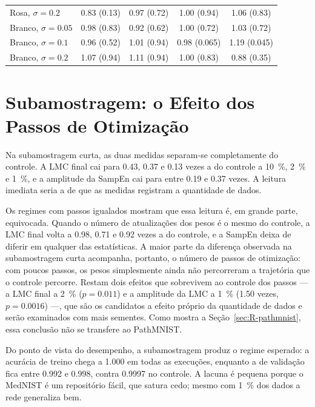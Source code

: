 \begin{table}[H]
\begin{tabular}{lcccc}
        Rosa, $\sigma = \num{0,2}$    & \num{0,83} (\num{0,13}) & \num{0,97} (\num{0,72}) & \num{1,00} (\num{0,94}) & \num{1,06} (\num{0,83}) \\
        Branco, $\sigma = \num{0,05}$ & \num{0,98} (\num{0,83}) & \num{0,92} (\num{0,62}) & \num{1,00} (\num{0,72}) & \num{1,03} (\num{0,72}) \\
        Branco, $\sigma = \num{0,1}$  & \num{0,96} (\num{0,52}) & \num{1,01} (\num{0,94}) & \num{0,98} (\num{0,065}) & \num{1,19} (\num{0,045}) \\
        Branco, $\sigma = \num{0,2}$  & \num{1,07} (\num{0,94}) & \num{1,11} (\num{0,94}) & \num{1,00} (\num{0,83}) & \num{0,88} (\num{0,35}) \\
        \bottomrule
    \end{tabular}
\end{table}

\section{Subamostragem: o Efeito dos Passos de Otimização}
\label{sec:R-subamostragem}

Na subamostragem curta, as duas medidas separam-se completamente do controle.
A LMC final cai para \num{0,43}, \num{0,37} e \num{0,13} vezes a do controle a
\SI{10}{\percent}, \SI{2}{\percent} e \SI{1}{\percent}, e a amplitude da SampEn
cai para entre \num{0,19} e \num{0,37} vezes. A leitura imediata seria a de que
as medidas registram a quantidade de dados.

Os regimes com passos igualados mostram que essa leitura é, em grande parte,
equivocada. Quando o número de atualizações dos pesos é o mesmo do controle, a
LMC final volta a \num{0,98}, \num{0,71} e \num{0,92} vezes a do controle, e
a SampEn deixa de diferir em qualquer das estatísticas. A maior parte da
diferença observada na subamostragem curta acompanha, portanto, o número de
passos de otimização: com poucos passos, os pesos simplesmente ainda não
percorreram a trajetória que o controle percorre. Restam dois efeitos que
sobrevivem ao controle dos passos --- a LMC final a \SI{2}{\percent}
($p = \num{0,011}$) e a amplitude da LMC a \SI{1}{\percent} (\num{1,50} vezes,
$p = \num{0,0016}$) ---, que são os candidatos a efeito próprio da quantidade
de dados e serão examinados com mais sementes. Como mostra a
Seção~\ref{sec:R-pathmnist}, essa conclusão não se transfere ao PathMNIST.

Do ponto de vista do desempenho, a subamostragem produz o regime esperado: a
acurácia de treino chega a \num{1,000} em todas as execuções, enquanto a de
validação fica entre \num{0,992} e \num{0,998}, contra \num{0,9997} no
controle. A lacuna é pequena porque o MedNIST é um repositório fácil, que
satura cedo; mesmo com \SI{1}{\percent} dos dados a rede generaliza bem.


